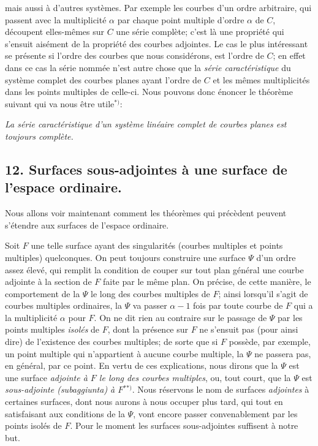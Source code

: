 \documentclass{article}
\begin{document}
mais aussi à d'autres systèmes. Par exemple les courbes d'un ordre arbitraire, qui passent avec la multiplicité $\alpha$ par chaque point multiple d'ordre $\alpha$ de $C$, découpent elles-mêmes sur $C$ une série complète; c'est là une propriété qui s'ensuit aisément de la propriété des courbes adjointes. Le cas le plus intéressant se présente si l'ordre des courbes que nous considérons, est l'ordre de $C$; en effet dans ce cas la série nommée n'est autre chose que la \emph{série caractéristique} du système complet des courbes planes ayant l'ordre de $C$ et les mêmes multiplicités dans les points multiples de celle-ci. Nous pouvons donc énoncer le théorème suivant qui va nous être utile${}^{*)}$:

\emph{La série caractéristique d'un système linéaire complet de courbes planes est toujours complète.}

\subsection*{12. Surfaces sous-adjointes à une surface de l'espace ordinaire.}

Nous allons voir maintenant comment les théorèmes qui précèdent peuvent s'étendre aux surfaces de l'espace ordinaire.

Soit $F$ une telle surface ayant des singularités (courbes multiples et points multiples) quelconques. On peut toujours construire une surface $\Psi$ d'un ordre assez élevé, qui remplit la condition de couper sur tout plan général une courbe adjointe à la section de $F$ faite par le même plan. On précise, de cette manière, le comportement de la $\Psi$ le long des courbes multiples de $F$; ainsi lorsqu'il s'agit de courbes multiples ordinaires, la $\Psi$ va passer $\alpha - 1$ fois par toute courbe de $F$ qui a la multiplicité $\alpha$ pour $F$. On ne dit rien au contraire sur le passage de $\Psi$ par les points multiples \emph{isolés} de $F$, dont la présence sur $F$ ne s'ensuit pas (pour ainsi dire) de l'existence des courbes multiples; de sorte que si $F$ possède, par exemple, un point multiple qui n'appartient à aucune courbe multiple, la $\Psi$ ne passera pas, en général, par ce point. En vertu de ces explications, nous dirons que la $\Psi$ est une surface \emph{adjointe à $F$ le long des courbes multiples}, ou, tout court, que la $\Psi$ est \emph{sous-adjointe (subaggiunta) à $F$}${}^{**)}$. Nous réservons le nom de surfaces \emph{adjointes} à certaines surfaces, dont nous aurons à nous occuper plus tard, qui tout en satisfaisant aux conditions de la $\Psi$, vont encore passer convenablement par les points isolés de $F$. Pour le moment les surfaces sous-adjointes suffisent à notre but.
\end{document}
